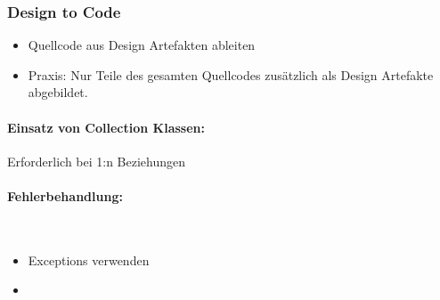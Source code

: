 \documentclass[../ZF_SWEN1.tex]{subfiles}
\begin{document}
\subsubsection{Design to Code}
\begin{itemize}
	\item Quellcode aus Design Artefakten ableiten
	\item Praxis: Nur Teile des gesamten Quellcodes zusätzlich als Design Artefakte abgebildet.
\end{itemize}

\paragraph{Einsatz von Collection Klassen:} Erforderlich bei 1:n Beziehungen

\paragraph{Fehlerbehandlung:}\\
\begin{itemize}
	\item Exceptions verwenden
	\item 
\end{itemize}
\end{document}
